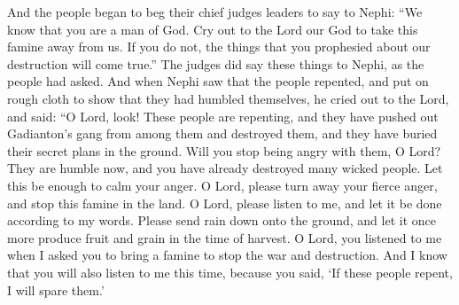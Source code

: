 And the people began to beg their chief judges leaders to say to Nephi: ``We know that you are a man of God. Cry out to the Lord our God to take this famine away from us. If you do not, the things that you prophesied about our destruction will come true.''
\bverse \iffalse And it came to pass that the judges did say unto Nephi, according to the words which had been desired. And it came to pass that when Nephi saw that the people had repented and did humble themselves in sackcloth, he cried again unto the Lord, saying: \fi
The judges did say these things to Nephi, as the people had asked. And when Nephi saw that the people repented, and put on rough cloth to show that they had humbled themselves, he cried out to the Lord, and said:
\bverse \iffalse O Lord, behold this people repenteth; and they have swept away the band of Gadianton from amongst them insomuch that they have become extinct, and they have concealed their secret plans in the earth. \fi
``O Lord, look! These people are repenting, and they have pushed out Gadianton's gang from among them and destroyed them, and they have buried their secret plans in the ground.
\bverse \iffalse Now, O Lord, because of this their humility wilt thou turn away thine anger, and let thine anger be appeased in the destruction of those wicked men whom thou hast already destroyed. \fi
Will you stop being angry with them, O Lord? They are humble now, and you have already destroyed many wicked people. Let this be enough to calm your anger.
\bverse \iffalse O Lord, wilt thou turn away thine anger, yea, thy fierce anger, and cause that this famine may cease in this land. \fi
O Lord, please turn away your fierce anger, and stop this famine in the land.
\bverse \iffalse O Lord, wilt thou hearken unto me, and cause that it may be done according to my words, and send forth rain upon the face of the earth, that she may bring forth her fruit, and her grain in the season of grain. \fi
O Lord, please listen to me, and let it be done according to my words. Please send rain down onto the ground, and let it once more produce fruit and grain in the time of harvest.
\bverse \iffalse O Lord, thou didst hearken unto my words when I said, Let there be a famine, that the pestilence of the sword might cease; and I know that thou wilt, even at this time, hearken unto my words, for thou saidst that: If this people repent I will spare them. \fi
O Lord, you listened to me when I asked you to bring a famine to stop the war and destruction. And I know that you will also listen to me this time, because you said, \lq If these people repent, I will spare them.\rq 
